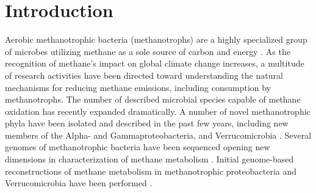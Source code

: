 \section{Introduction}
Aerobic methanotrophic bacteria (methanotrophs) are a highly specialized group of microbes utilizing methane as a sole source of carbon and energy \cite{hanson1996, murrell2009}.
As the recognition of methane's impact on global climate change increases, a multitude of research activities have been directed toward understanding the natural mechanisms for reducing methane emissions, including consumption by methanotrophs.
The number of described microbial species capable of methane oxidation has recently expanded dramatically.
A number of novel methanotrophic phyla have been isolated and described in the past few years, including new members of the Alpha- and Gammaproteobacteria, and Verrucomicrobia \cite{trotsenko2008, mila2009, murrell2009}.
Several genomes of methanotrophic bacteria have been sequenced opening new dimensions in characterization of methane metabolism \cite{ward2004, dunfield2007, hou2008, chen2010, stein2010, stein2011, dam2012b}.
Initial genome-based reconstructions of methane metabolism in methanotrophic proteobacteria and Verrucomicrobia have been performed \cite{ward2004, kelly2005, hou2008, khadem2011}.


